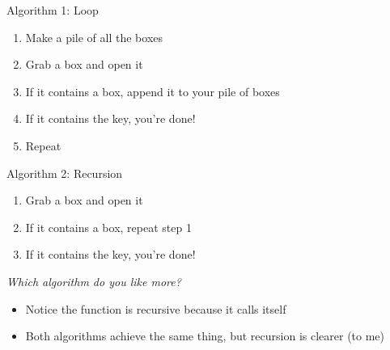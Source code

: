 \documentclass[
  ignorenonframetext,
]{beamer}
\begin{document}
\begin{frame}{Algorithm 1: Loop}
\protect\hypertarget{algorithm-1-loop}{}
\begin{enumerate}
\item
  Make a pile of all the boxes
\item
  Grab a box and open it
\item
  If it contains a box, append it to your pile of boxes
\item
  If it contains the key, you're done!
\item
  Repeat
\end{enumerate}
\end{frame}

\begin{frame}{Algorithm 2: Recursion}
\protect\hypertarget{algorithm-2-recursion}{}
\begin{enumerate}
\item
  Grab a box and open it
\item
  If it contains a box, repeat step 1
\item
  If it contains the key, you're done!
\end{enumerate}

\vspace{1cm}

\emph{Which algorithm do you like more?}

\begin{itemize}
\item
  Notice the function is recursive because it calls itself
\item
  Both algorithms achieve the same thing, but recursion is clearer (to
  me)
\end{itemize}
\end{frame}
\end{document}

